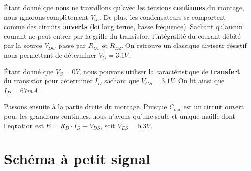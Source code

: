 \documentclass{../../template/tp}
\begin{document}
	{%
	Étant donné que nous ne travaillons qu'avec les tensions \textbf{continues} du montage, nous ignorons complètement $V_{in}$.
	De plus, les condensateurs se comportent comme des circuits \textbf{ouverts} (loi long terme, basse fréquence).
	Sachant qu'aucun courant ne peut entrer par la grille du transistor, l'intégralité du courant débité par la source $V_{DC}$ passe par $R_{B1}$ et $R_{B2}$.
	On retrouve un classique diviseur résistif nous permettant de déterminer $V_G = 3.1 V$.

	Étant donné que $V_S = 0 V$, nous pouvons utiliser la caractéristique de \textbf{transfert} du transistor pour déterminer $I_D$ sachant que $V_{GS} = 3.1 V$. On lit ainsi que $I_D = 67 mA$.

	Passons ensuite à la partie droite du montage.
	Puisque $C_{out}$ est un circuit ouvert pour les grandeurs continues, nous n'avons qu'une seule et unique maille dont l'équation est $E = R_D \cdot I_D + V_{DS}$, soit $V_{DS} = 5.3 V$.

	
	}


\section{Schéma à petit signal}
\end{document}
